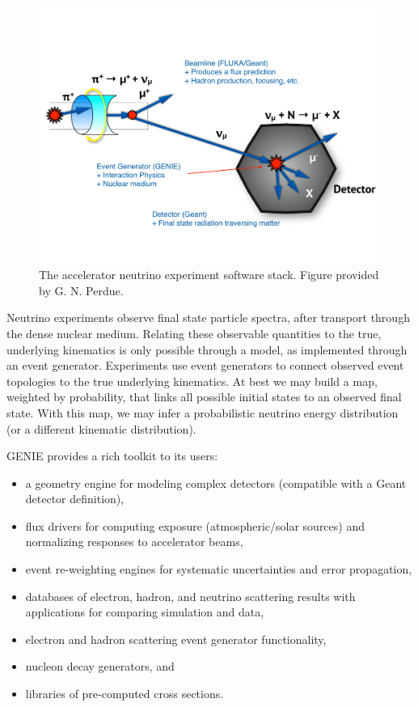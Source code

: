 \begin{figure}
  \centering
  \includegraphics[height=0.32\textheight]{software-computing/figures/3partstack}
  \caption{The accelerator neutrino experiment software stack. Figure provided by G. N. Perdue.}
  \label{fig:3partstack}
\end{figure}

Neutrino experiments observe final state particle spectra, after transport through the dense nuclear medium.
Relating these observable quantities to the true, underlying kinematics is only possible through a model, as implemented through an event generator.
Experiments use event generators to connect observed event topologies to the true underlying kinematics.
At best we may build a map, weighted by probability, that links all possible initial states to an observed final state.
With this map, we may infer a probabilistic neutrino energy distribution (or a different kinematic distribution).

GENIE provides a rich toolkit to its users:
\begin{itemize}
\item a geometry engine for modeling complex detectors (compatible with a Geant detector definition),
\item flux drivers for computing exposure (atmospheric/solar sources) and normalizing responses to accelerator beams,
\item event re-weighting engines for systematic uncertainties and error propagation,
\item databases of electron, hadron, and neutrino scattering results with applications for comparing simulation and data,
\item electron and hadron scattering event generator functionality,
\item nucleon decay generators, and
\item libraries of pre-computed cross sections.
\end{itemize}

